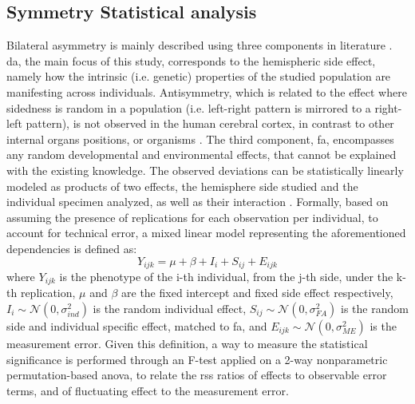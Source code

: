 \subsection{Symmetry Statistical analysis}
Bilateral asymmetry is mainly described using three components in literature \cite{klingenberg2002}\cite{Vingerhoets2021}. \Acf{da}, the main focus of this study, corresponds to the hemispheric side effect, namely how the intrinsic (i.e. genetic) properties of the studied population are manifesting across individuals. Antisymmetry, which is related to the effect where sidedness is random in a population (i.e. left-right pattern is mirrored to a right-left pattern), is not observed in the human cerebral cortex, in contrast to other internal organs positions, or organisms \cite{Neubauer2020}. The third component, \acf{fa}, encompasses any random developmental and environmental effects, that cannot be explained with the existing knowledge. The observed deviations can be statistically linearly modeled as products of two effects, the hemisphere side studied and the individual specimen analyzed, as well as their interaction \cite{klingenberg2002}. Formally, based on \cite{VanDongen1999} assuming the presence of replications for each observation per individual, to account for technical error, a mixed linear model representing the aforementioned dependencies is defined as:
\begin{equation}
Y_{ijk} = \mu + \beta + I_i + S_{ij} + E_{ijk}
\end{equation}
where $Y_{ijk}$ is the phenotype of the i-th individual, from the j-th side, under the k-th replication, $\mu$ and $\beta$ are the fixed intercept and fixed side effect respectively, $I_i\sim\mathcal{N}(0,\sigma^2_{ind})$ is the random individual effect,  $S_{ij}\sim\mathcal{N}(0,\sigma^2_{FA})$ is the random side and individual specific effect, matched to \ac{fa}, and $E_{ijk}\sim\mathcal{N}(0,\sigma^2_{ME})$ is the measurement error. Given this definition, a way to measure the statistical significance is performed through an F-test applied on a 2-way nonparametric permutation-based \ac{anova}, to relate the \ac{rss} ratios of effects to observable error terms, and of fluctuating effect to the measurement error. 

